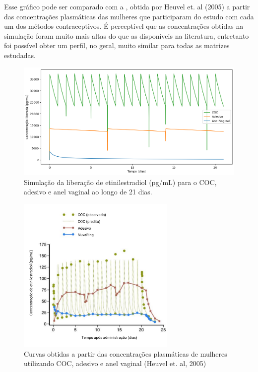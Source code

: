 Esse gráfico pode ser comparado com a , obtida por Heuvel et. al (2005) a partir das concentrações plasmáticas das mulheres que participaram do estudo com cada um dos métodos contraceptivos. É perceptível que as concentrações obtidas na simulação foram muito mais altas do que as disponíveis na literatura, entretanto foi possível obter um perfil, no geral, muito similar para todas as matrizes estudadas.

\begin{figure}[!htb]
    \centering
        \includegraphics[width=1\textwidth]{figuras/liberacao_combinada.png}
        \caption[Liberação de etinilestradiol simulada ao longo do tempo]{Simulação da liberação de etinilestradiol (pg/mL) para o COC, adesivo e anel vaginal ao longo de 21 dias.}
    \label{fig:liberacao_combinada}
\end{figure}

\begin{figure}[!htb]
    \centering
        \includegraphics[width=0.68\textwidth]{figuras/Heuvel.png}
        \caption[Curvas experimentais de concentrações plasmáticas de EE]{Curvas obtidas a partir das concentrações plasmáticas de mulheres utilizando COC, adesivo e anel vaginal (Heuvel et. al, 2005)}
    \label{fig:Heuvel}
\end{figure}

